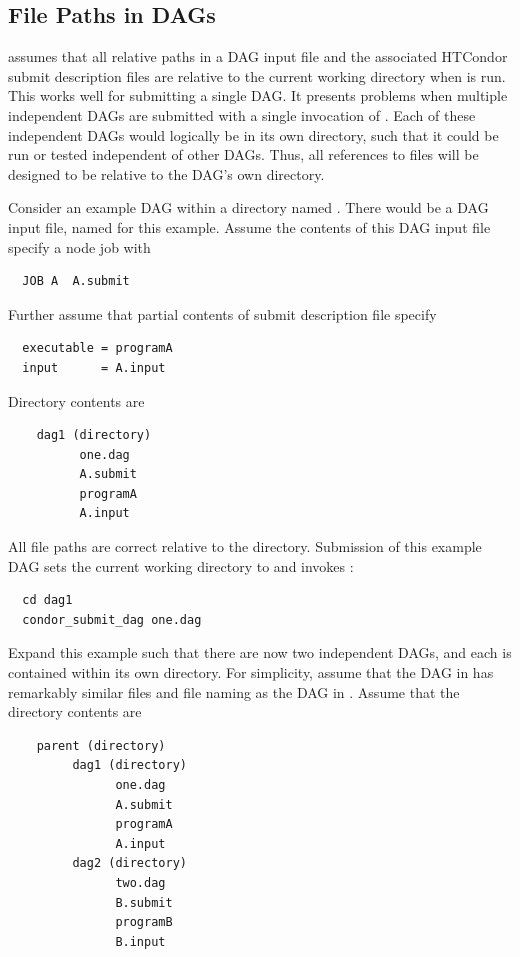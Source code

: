 \subsection{\label{sec:DAGPaths}File Paths in DAGs}

 assumes that all relative paths in a
DAG input file and the associated HTCondor submit description files
are relative to the current
working directory when  is run.  
This works well for submitting a single DAG.
It presents problems when multiple independent DAGs are submitted
with a single invocation of .
Each of these independent DAGs would logically be in its own directory, 
such that it could be run or tested independent of other DAGs.
Thus, all references to files will be designed to be relative to
the DAG's own directory.


Consider an example DAG within a directory named .
There would be a DAG input file, named  for this example.
Assume the contents of this DAG input file specify a node job with
\begin{verbatim}
  JOB A  A.submit
\end{verbatim}
Further assume that partial contents of submit description file 
 specify
\begin{verbatim}
  executable = programA
  input      = A.input
\end{verbatim}

Directory contents are 
\begin{verbatim}
    dag1 (directory)
          one.dag
          A.submit
          programA
          A.input
\end{verbatim}

All file paths are correct relative to the  directory.
Submission of this example DAG sets the current working directory
to  and invokes :
\begin{verbatim}
  cd dag1
  condor_submit_dag one.dag
\end{verbatim}

Expand this example such that there are now two independent DAGs,
and each is contained within its own directory. 
For simplicity, assume that the DAG in  has remarkably
similar files and file naming as the DAG in .
Assume that the directory contents are 
\begin{verbatim}
    parent (directory)
         dag1 (directory)
               one.dag
               A.submit
               programA
               A.input
         dag2 (directory)
               two.dag
               B.submit
               programB
               B.input
\end{verbatim}

